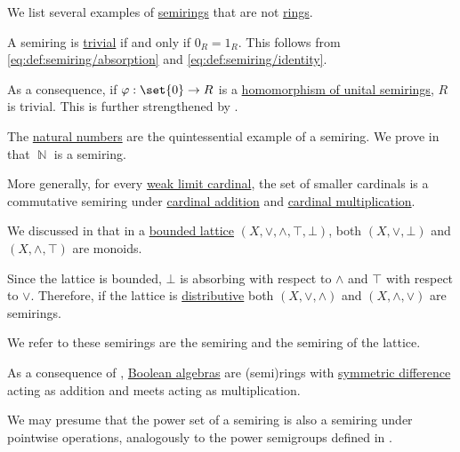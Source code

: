 \begin{example}\label{ex:def:semiring}
  We list several examples of \hyperref[def:semiring]{semirings} that are not \hyperref[def:ring]{rings}.

  \begin{thmenum}
     A semiring is \hyperref[def:semiring/trivial]{trivial} if and only if \( 0_R = 1_R \). This follows from \eqref{eq:def:semiring/absorption} and \eqref{eq:def:semiring/identity}.

    As a consequence, if \( \varphi: \set{ 0 } \to R \) is a \hyperref[def:semiring/homomorphism]{homomorphism of unital semirings}, \( R \) is trivial. This is further strengthened by .

     The \hyperref[def:natural_numbers]{natural numbers} are the quintessential example of a semiring. We prove in  that \( \BbbN \) is a semiring.

     More generally, for every \hyperref[def:successor_and_limit_cardinal/weak_limit]{weak limit cardinal}, the set of smaller cardinals is a commutative semiring under \hyperref[def:cardinal_arithmetic/addition]{cardinal addition} and \hyperref[def:cardinal_arithmetic/multiplication]{cardinal multiplication}.

     We discussed in  that in a \hyperref[def:extremal_points/bounds]{bounded lattice} \( (X, \vee, \wedge, \top, \bot) \), both \( (X, \vee, \bot) \) and \( (X, \wedge, \top) \) are monoids.

    Since the lattice is bounded, \( \bot \) is absorbing with respect to \( \wedge \) and \( \top \) with respect to \( \vee \). Therefore, if the lattice is \hyperref[def:distributive_lattice]{distributive} both \( (X, \vee, \wedge) \) and \( (X, \wedge, \vee) \) are semirings.

    We refer to these semirings are the  semiring and the  semiring of the lattice.

     As a consequence of , \hyperref[def:boolean_algebra]{Boolean algebras} are (semi)rings with \hyperref[def:symmetric_difference]{symmetric difference} acting as addition and meets acting as multiplication.

     We may presume that the power set of a semiring is also a semiring under pointwise operations, analogously to the power semigroups defined in .


\end{thmenum}
\end{example}
